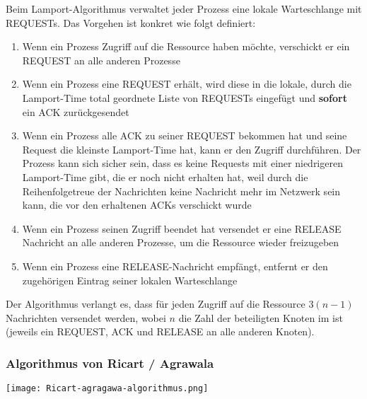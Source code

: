 Beim Lamport-Algorithmus verwaltet jeder Prozess eine lokale Warteschlange mit REQUESTs. Das Vorgehen ist konkret wie folgt definiert:
\begin{enumerate}
    \item Wenn ein Prozess Zugriff auf die Ressource haben möchte, verschickt er ein REQUEST an alle anderen Prozesse
    \item Wenn ein Prozess eine REQUEST erhält, wird diese in die lokale, durch die Lamport-Time total geordnete Liste von REQUESTs eingefügt und \textbf{sofort} ein ACK zurückgesendet
    \item Wenn ein Prozess alle ACK zu seiner REQUEST bekommen hat und seine Request die kleinste Lamport-Time hat, kann er den Zugriff durchführen. Der Prozess kann sich sicher sein, dass es keine Requests mit einer niedrigeren Lamport-Time gibt, die er noch nicht erhalten hat, weil durch die Reihenfolgetreue der Nachrichten keine Nachricht mehr im Netzwerk sein kann, die vor den erhaltenen ACKs verschickt wurde
    \item Wenn ein Prozess seinen Zugriff beendet hat versendet er eine RELEASE Nachricht an alle anderen Prozesse, um die Ressource wieder freizugeben
    \item Wenn ein Prozess eine RELEASE-Nachricht empfängt, entfernt er den zugehörigen Eintrag seiner lokalen Warteschlange
\end{enumerate}

Der Algorithmus verlangt es, dass für jeden Zugriff auf die Ressource $3(n-1)$ Nachrichten versendet werden, wobei $n$ die Zahl der beteiligten Knoten im ist (jeweils ein REQUEST, ACK und RELEASE an alle anderen Knoten).

\subsubsection{Algorithmus von Ricart / Agrawala}

\texttt{[image: Ricart-agragawa-algorithmus.png]}

